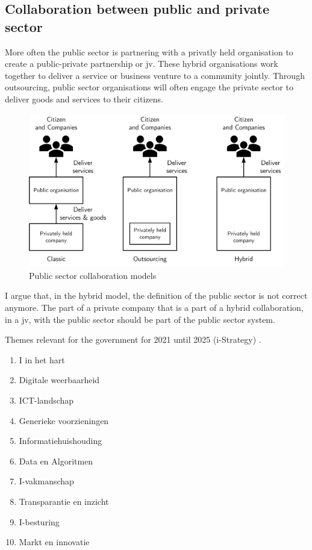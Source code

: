 \subsection{Collaboration between public and private sector}

More often the public sector is partnering with a privatly held organisation to create a public-private partnership or \acrfull{jv}. These hybrid organisations work together to deliver a service or business venture to a community jointly. Through outsourcing, public sector organisations will often engage the private sector to deliver goods and services to their citizens. 

\begin{figure}[H]
	\centering
	\includegraphics[width=0.7\linewidth]{images/publicsector3modelsofcolaboration}
	\caption[Public sector collaboration models]{Public sector collaboration models}
	\label{fig:publicsector3modelsofcolaboration}
\end{figure}

I argue that, in the hybrid model, the definition of the public sector is not correct anymore. The part of a private company that is a part of a hybrid collaboration, in a \gls{jv}, with the public sector should be part of the public sector system.

Themes relevant for the government for 2021 until 2025 (i-Strategy) \parencite{Digitaleoverheid}.

\begin{enumerate}
	\item{I in het hart}
	\item{Digitale weerbaarheid}
	\item{ICT-landschap}
	\item{Generieke voorzieningen}
	\item{Informatiehuishouding}
	\item{Data en Algoritmen}
	\item{I-vakmanschap}
	\item{Transparantie en inzicht}
	\item{I-besturing}
	\item{Markt en innovatie}
\end{enumerate}



